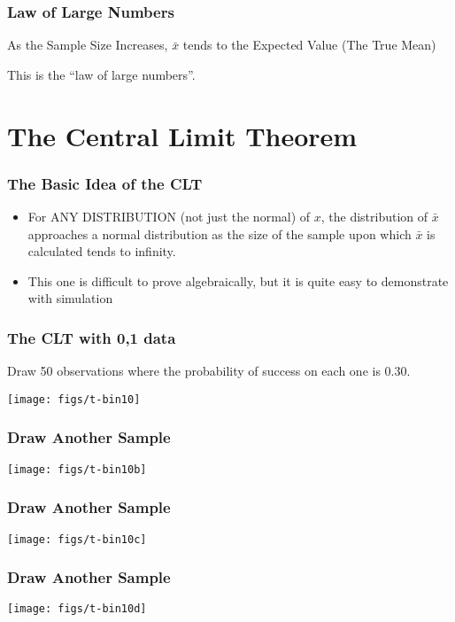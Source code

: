 \documentclass[10pt,english]{beamer}
\begin{document}
\begin{frame}
 \frametitle{Law of Large Numbers}

As the Sample Size Increases, $\bar{x}$ tends to the Expected Value
(The True Mean)

This is the {}``law of large numbers''.

\end{frame}

\section{The Central Limit Theorem}

\begin{frame}
  \frametitle{The Basic Idea of the CLT}
  \begin{itemize}
    \item For ANY DISTRIBUTION (not just the normal) of $x$, the
      distribution of $\bar{x}$ approaches a normal distribution
      as the size of the sample upon which $\bar{x}$ is calculated
      tends to infinity.
    \item This one is difficult to prove algebraically, but it is
      quite easy to demonstrate with simulation
  \end{itemize}
\end{frame}


\begin{frame}
  \frametitle{The CLT with 0,1 data}

  Draw 50 observations where the probability of success on each one is 0.30.

\texttt{[image: figs/t-bin10]}


\end{frame}




\begin{frame}
  \frametitle{Draw Another Sample}

\texttt{[image: figs/t-bin10b]}


\end{frame}



\begin{frame}
  \frametitle{Draw Another Sample}

\texttt{[image: figs/t-bin10c]}


\end{frame}



\begin{frame}
  \frametitle{Draw Another Sample}

\texttt{[image: figs/t-bin10d]}


\end{frame}
\end{document}
